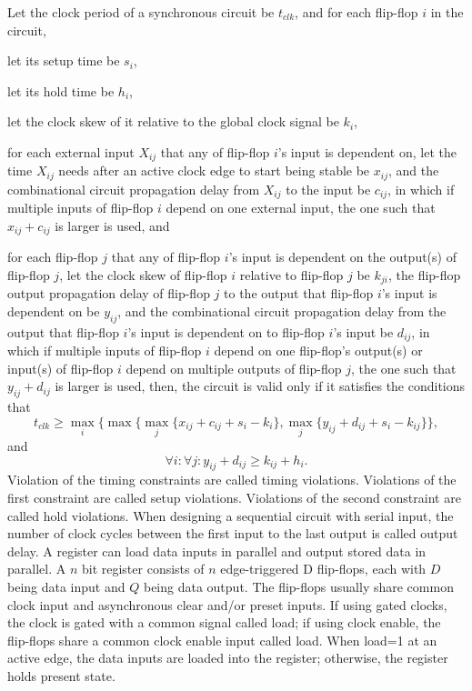 \documentclass[a4paper,12pt]{report}
\begin{document}
Let the clock period of a synchronous circuit be $t_{clk}$, and for each flip-flop $i$ in the circuit,
\bit
\item let its setup time be $s_i$,
\item let its hold time be $h_i$,
\item let the clock skew of it relative to the global clock signal be $k_i$,
\item for each external input $X_{ij}$ that any of flip-flop $i$'s input is dependent on, let the time $X_{ij}$ needs after an active clock edge to start being stable be $x_{ij}$, and the combinational circuit propagation delay from $X_{ij}$ to the input be $c_{ij}$, in which if multiple inputs of flip-flop $i$ depend on one external input, the one such that $x_{ij}+c_{ij}$ is larger is used, and
\item for each flip-flop $j$ that any of flip-flop $i$'s input is dependent on the output(s) of flip-flop $j$, let the clock skew of flip-flop $i$ relative to flip-flop $j$ be $k_{ji}$, the flip-flop output propagation delay of flip-flop $j$ to the output that flip-flop $i$'s input is dependent on be $y_{ij}$, and the combinational circuit propagation delay from the output that flip-flop $i$'s input is dependent on to flip-flop $i$'s input be $d_{ij}$, in which if multiple inputs of flip-flop $i$ depend on one flip-flop's output(s) or input(s) of flip-flop $i$ depend on multiple outputs of flip-flop $j$, the one such that $y_{ij}+d_{ij}$ is larger is used,
\eit
then, the circuit is valid only if it satisfies the conditions that
\[t_{clk}\geq\max_i\{\max\{\max_j\{x_{ij}+c_{ij}+s_i-k_i\},\max_j\{y_{ij}+d_{ij}+s_i-k_{ij}\}\},\]
and
\[\forall i\colon\forall j\colon y_{ij}+d_{ij}\geq k_{ij}+h_i.\]
Violation of the timing constraints are called timing violations. Violations of the first constraint are called setup violations. Violations of the second constraint are called hold violations.
When designing a sequential circuit with serial input, the number of clock cycles between the first input to the last output is called output delay.
A register can load data inputs in parallel and output stored data in parallel. A $n$ bit register consists of $n$ edge-triggered D flip-flops, each with $D$ being data input and $Q$ being data output. The flip-flops usually share common clock input and asynchronous clear and/or preset inputs. If using gated clocks, the clock is gated with a common signal called load; if using clock enable, the flip-flops share a common clock enable input called load. When load=1 at an active edge, the data
inputs are loaded into the register; otherwise, the register holds present state.
\end{document}

